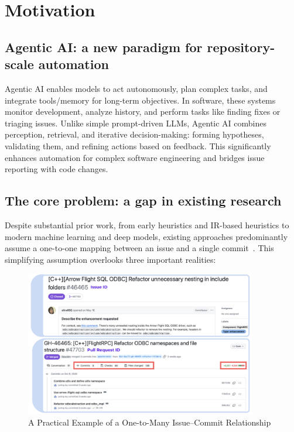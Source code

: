 
\section{Motivation}

\subsection{Agentic AI: a new paradigm for repository-scale automation}
Agentic AI enables models to act autonomously, plan complex tasks, and integrate tools/memory for long-term objectives. In software, these systems monitor development, analyze history, and perform tasks like finding fixes or triaging issues. Unlike simple prompt-driven LLMs, Agentic AI combines perception, retrieval, and iterative decision-making: forming hypotheses, validating them, and refining actions based on feedback. This significantly enhances automation for complex software engineering and bridges issue reporting with code changes.



\subsection{The core problem: a gap in existing research}

Despite substantial prior work, from early heuristics and IR-based heuristics to modern machine learning and deep models, existing approaches predominantly assume a one-to-one mapping between an issue and a single commit~\cite{r17,r19,r20,r7}. This simplifying assumption overlooks three important realities:

    \begin{figure}[H]
        \centering
        \includegraphics[width=0.9\textwidth]{Figures/issue-pr-demo-example.png}
        \caption{A Practical Example of a One-to-Many Issue--Commit Relationship}
        \label{fig:issue_pr_demo_example}
    \end{figure}

